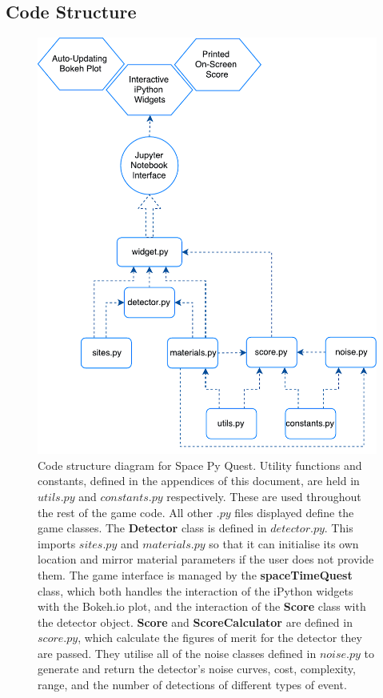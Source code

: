 \documentclass{article}
\begin{document}
\subsection{Code Structure}
\label{sec::structure}
\begin{figure}[h!]
    \centering
    \includegraphics[scale=0.75]{SPQstructure.pdf}
    \caption{Code structure diagram for Space Py Quest. Utility
      functions and constants, defined in the appendices of this
      document, are held in $utils.py$ and $constants.py$
      respectively. These are used throughout the rest of the game
      code. All other $.py$ files displayed define the game
      classes. The \textbf{Detector} class is defined in
      $detector.py$. This imports $sites.py$ and $materials.py$ so
      that it can initialise its own location and mirror material
      parameters if the user does not provide them. The game interface
      is managed by the \textbf{spaceTimeQuest} class, which both
      handles the interaction of the iPython widgets with the Bokeh.io
      plot, and the interaction of the \textbf{Score} class with the
      detector object. \textbf{Score} and \textbf{ScoreCalculator} are
      defined in $score.py$, which calculate the figures of merit for
      the detector they are passed. They utilise all of the noise
      classes defined in $noise.py$ to generate and return the
      detector's noise curves, cost, complexity, range, and the number
      of detections of different types of event.}
    \label{fig:spq1}
\end{figure}
\end{document}
